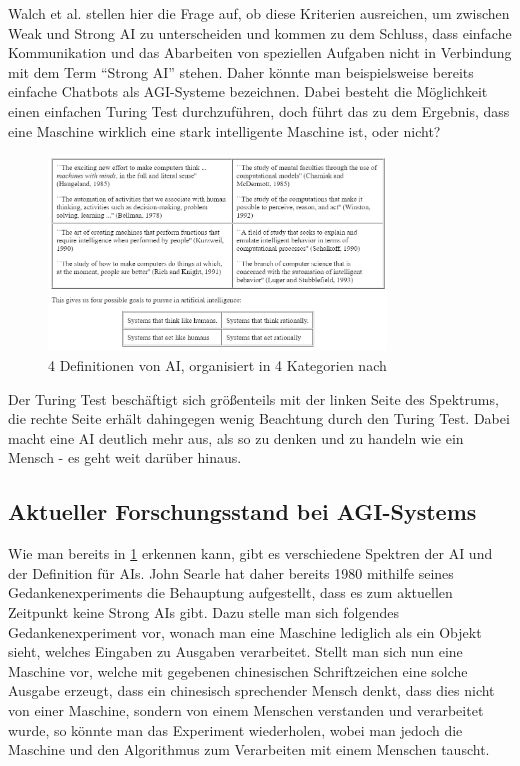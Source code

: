             Walch et al. stellen hier die Frage auf, ob diese Kriterien ausreichen, um zwischen Weak und Strong AI
            zu unterscheiden und kommen zu dem Schluss, dass einfache Kommunikation und das Abarbeiten von
            speziellen Aufgaben nicht in Verbindung mit dem Term ``Strong AI'' stehen. Daher könnte man beispielsweise
            bereits einfache Chatbots als AGI-Systeme bezeichnen. \cite{walch_world_2019} Dabei besteht die
            Möglichkeit einen einfachen Turing Test durchzuführen, doch führt das zu dem Ergebnis, dass eine
            Maschine wirklich eine stark intelligente Maschine ist, oder nicht?
            \begin{figure}[h]
                \begin{center}
                    \includegraphics[width=0.8\textwidth]{figures/ai-definitions.png}
                    \caption[4 Definitionen AI]{4 Definitionen von AI, organisiert in 4 Kategorien nach \cite{russell}}
                    \label{pic:ai-definitions}
                \end{center}
            \end{figure}
            Der Turing Test beschäftigt sich größenteils mit der linken Seite des Spektrums, die rechte Seite erhält
            dahingegen wenig Beachtung durch den Turing Test. Dabei macht eine AI deutlich mehr aus, als so zu denken
            und zu handeln wie ein Mensch - es geht weit darüber hinaus.


        \subsection{Aktueller Forschungsstand bei AGI-Systems}
            Wie man bereits in \ref{pic:ai-definitions} erkennen kann, gibt es verschiedene Spektren der AI und der
            Definition für AIs. John Searle hat daher bereits 1980 mithilfe seines Gedankenexperiments die Behauptung
            aufgestellt, dass es zum aktuellen Zeitpunkt keine Strong AIs gibt. Dazu stelle man sich folgendes
            Gedankenexperiment vor, wonach man eine Maschine lediglich als ein Objekt sieht, welches Eingaben zu
            Ausgaben verarbeitet. \cite{cole_2014} Stellt man sich nun eine Maschine vor, welche mit gegebenen
            chinesischen Schriftzeichen eine solche Ausgabe erzeugt, dass ein chinesisch sprechender Mensch denkt,
            dass dies nicht von einer Maschine, sondern von einem Menschen verstanden und verarbeitet wurde, so könnte
            man das Experiment wiederholen, wobei man jedoch die Maschine und den Algorithmus zum Verarbeiten mit einem
            Menschen tauscht.

